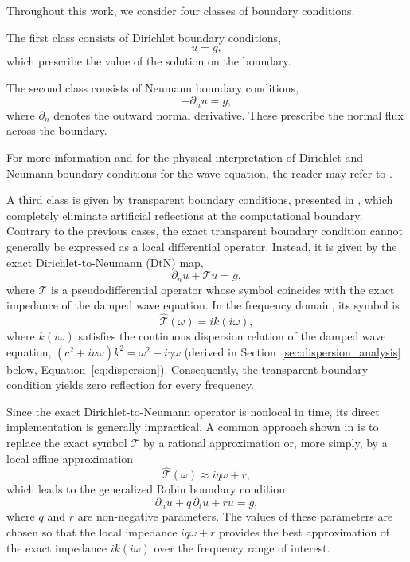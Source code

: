 \documentclass{Configuration_Files/PoliMi3i_thesis}
\newif\ifshowthesischanges
\DeclareRobustCommand{\thesischange}[2]{%
    \ifshowthesischanges
        \textcolor{#1}{#2}%
    \else
        #2%
    \fi
}
\def\thesischange#1#2{#2}%
\begin{document}
Throughout this work, we consider four classes of boundary conditions.

The first class consists of Dirichlet boundary conditions,
\begin{equation*}
u=g,
\end{equation*}
which prescribe the value of the solution on the boundary.

The second class consists of Neumann boundary conditions,
\begin{equation*}
-\partial_nu=g,
\end{equation*}
where \(\partial_n\) denotes the outward normal derivative. These prescribe the normal flux across the boundary.

For more information and for the physical interpretation of Dirichlet and Neumann boundary conditions for the wave equation, the reader may refer to \cite{bilbao_numerical_2009}.

A third class is given by transparent boundary conditions, presented in \cite{engquist_absorbing_1977,gander_absorbing_2004}, which completely eliminate artificial reflections at the computational boundary. Contrary to the previous cases, the exact transparent boundary condition cannot generally be expressed as a local differential operator. Instead, it is given by the exact Dirichlet-to-Neumann (DtN) map,
\begin{equation*}
\partial_nu+\mathcal{T}u=g,
\end{equation*}
where \(\mathcal{T}\) is a pseudodifferential operator whose symbol coincides with the exact impedance of the damped wave equation. In the frequency domain, its symbol is
\begin{equation*}
\widehat{\mathcal{T}}(\omega)
=
ik(i\omega),
\end{equation*}
\thesischange{red}{where \(k(i\omega)\) satisfies the continuous dispersion relation of the damped wave equation, $(c^2+i\nu\omega)k^2 = \omega^2 - i\gamma\omega$ (derived in Section~\ref{sec:dispersion_analysis} below, Equation~\eqref{eq:dispersion}).} Consequently, the transparent boundary condition yields zero reflection for every frequency.

Since the exact Dirichlet-to-Neumann operator is nonlocal in time, its direct implementation is generally impractical. A common approach shown in \cite{gander_absorbing_2004} is to replace the exact symbol \(\mathcal{T}\) by a rational approximation or, more simply, by a local affine approximation
\begin{equation*}
\widehat{\mathcal{T}}(\omega)
\approx
iq\omega+r,
\end{equation*}
which leads to the generalized Robin boundary condition
\begin{equation}
\label{eq:robin_boundary}
\partial_nu
+
q\,\partial_tu
+
ru
=
g,
\end{equation}
where \(q\) and \(r\) are non-negative parameters. The values of these parameters are chosen so that the local impedance \(iq\omega+r\) provides the best approximation of the exact impedance \(ik(i\omega)\) over the frequency range of interest.
\end{document}
